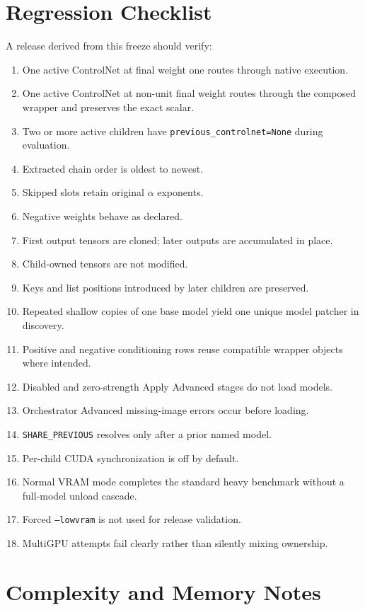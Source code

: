 \documentclass[11pt]{article}
\newcommand{\code}[1]{\texttt{#1}}
\begin{document}
\section{Regression Checklist}

A release derived from this freeze should verify:

\begin{enumerate}
  \item One active ControlNet at final weight one routes through native execution.
  \item One active ControlNet at non-unit final weight routes through the composed wrapper and preserves the exact scalar.
  \item Two or more active children have \code{previous\_controlnet=None} during evaluation.
  \item Extracted chain order is oldest to newest.
  \item Skipped slots retain original $\alpha$ exponents.
  \item Negative weights behave as declared.
  \item First output tensors are cloned; later outputs are accumulated in place.
  \item Child-owned tensors are not modified.
  \item Keys and list positions introduced by later children are preserved.
  \item Repeated shallow copies of one base model yield one unique model patcher in discovery.
  \item Positive and negative conditioning rows reuse compatible wrapper objects where intended.
  \item Disabled and zero-strength Apply Advanced stages do not load models.
  \item Orchestrator Advanced missing-image errors occur before loading.
  \item \code{SHARE\_PREVIOUS} resolves only after a prior named model.
  \item Per-child CUDA synchronization is off by default.
  \item Normal VRAM mode completes the standard heavy benchmark without a full-model unload cascade.
  \item Forced \code{--lowvram} is not used for release validation.
  \item MultiGPU attempts fail clearly rather than silently mixing ownership.
\end{enumerate}

\section{Complexity and Memory Notes}
\end{document}
